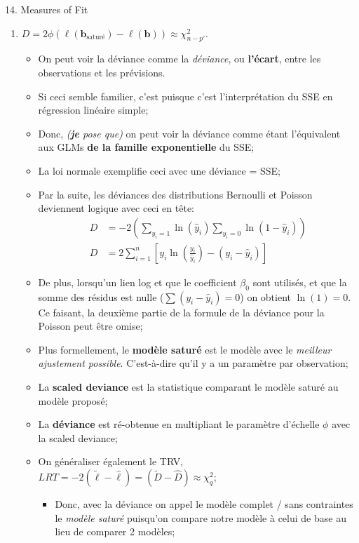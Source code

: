 \documentclass[12pt, titlepage, french]{report}
\begin{document}
\begin{CHPT_SUMM}[label = {GLM-MEZ-FIT}]{14. Measures of Fit}
\begin{enumerate}
	\item[]	$D = 2 \phi \left( \ell(\bm{b}_{\text{saturé}}) - \ell(\bm{b}) \right) \approx \chi^{2}_{n - p'}$.
	\begin{itemize}
		\item	On peut voir la déviance comme la \textit{déviance}, ou \textbf{l'écart}, entre les observations et les prévisions. 
		\item[]	Si ceci semble familier, c'est puisque c'est l'interprétation du SSE en régression linéaire simple;
		\item[]	Donc, \textit{(\textbf{je} pose que)} on peut voir la déviance comme étant l'équivalent aux GLMs \textbf{de la famille exponentielle} du SSE;
		\item	La loi normale exemplifie ceci avec une déviance = SSE;
		\item	Par la suite, les déviances des distributions Bernoulli et Poisson deviennent logique avec ceci en tête:
		\begin{align*}
			D	&=	-2 \left( \underset{y_{i} = 1}{\sum} \ln(\hat{y}_{i}) \underset{y_{i} = 0}{\sum} \ln(1 - \hat{y}_{i}) \right)	\\
			D	&=	2 \sum_{i = 1}^{n} \left[ y_{i} \ln \left( \frac{y_{i}}{\hat{y}_{i}} \right) - (y_{i} - \hat{y}_{i}) \right]
		\end{align*}
		\item[]	De plus, lorsqu'un lien log et que le coefficient $\beta_{0}$ sont utilisés, et que la somme des résidus est nulle ($\sum (y_{i} - \hat{y}_{i}) = 0$) on obtient $\ln(1) = 0$. Ce faisant, la deuxième partie de la formule de la déviance pour la Poisson peut être omise;
		\item	Plus formellement, le \textbf{modèle saturé} est le modèle avec le \textit{meilleur ajustement possible}. C'est-à-dire qu'il y a un paramètre par observation;
		\item	La \textbf{scaled deviance} est la statistique comparant le modèle saturé au modèle proposé;
		\item	La \textbf{déviance} est ré-obtenue en multipliant le paramètre d'échelle $\phi$ avec la scaled deviance;
	\item On généraliser également le TRV, $LRT = -2(\tilde{\ell} - \hat{\ell}) = (\tilde{D} - \hat{D}) \approx	\chi_{q}^{2}$;
		\begin{itemize}
			\item	Donc, avec la déviance on appel le modèle complet / sans contraintes le \textit{modèle saturé} puisqu'on compare notre modèle à celui de base au lieu de comparer 2 modèles;

\end{itemize}
\end{itemize}
\end{enumerate}
\end{CHPT_SUMM}
\end{document}
